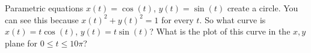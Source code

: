 Parametric equations $x(t)=\cos(t)$, $y(t)=\sin(t)$ create a circle.  You can see this because $x(t)^2+y(t)^2=1$ for every $t$.  So what curve is $x(t) = t\cos(t)$, $y(t) = t\sin(t)$?  What is the plot of this curve in the $x,y$ plane for $0\le t \le 10 \pi$?